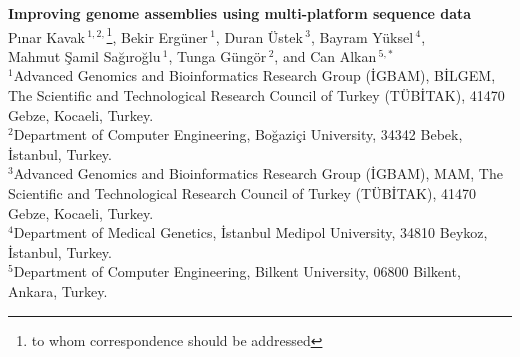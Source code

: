 \documentclass[12pt]{article}
\begin{document}
 \renewcommand{\thefootnote}{\fnsymbol{footnote}} 

\begin{center}
  {\bf Improving genome assemblies using multi-platform sequence data}\\

  P\i nar Kavak\,$^{1,2,}$\footnote{to whom correspondence should be addressed},  Bekir Erg\"{u}ner\,$^{1}$,  Duran \"{U}stek\,$^{3}$,  Bayram Y\"{u}ksel\,$^{4}$, \\
  Mahmut \c{S}amil Sa\u{g}\i ro\u{g}lu\,$^1$, 
  Tunga G\"{u}ng\"{o}r\,$^{2}$, and 
  Can Alkan\,$^{5,*}$ \\ 

  {\scriptsize
  $^{1}$Advanced Genomics and Bioinformatics Research Group (\.{I}GBAM), B\.{I}LGEM, The Scientific and Technological Research Council of Turkey (T\"{U}B\.{I}TAK), 41470 Gebze, Kocaeli, Turkey.\\
  $^{2}$Department of Computer Engineering, Bo\u{g}azi\c{c}i University, 34342 Bebek, \.{I}stanbul, Turkey.\\
  $^{3}$Advanced Genomics and Bioinformatics Research Group (\.{I}GBAM), MAM, The Scientific and Technological Research Council of Turkey (T\"{U}B\.{I}TAK), 41470 Gebze, Kocaeli, Turkey.\\
  $^{4}$Department of Medical Genetics, \.{I}stanbul Medipol University, 34810 Beykoz, \.{I}stanbul, Turkey.\\
  $^{5}$Department of Computer Engineering, Bilkent University, 06800 Bilkent, Ankara, Turkey.
  }
\end{center}

\begin{abstract}
\textit{De novo} assembly problem with the short reads of next generation sequencing technologies still waits for innovative approaches. There exist assembly programs with different capabilities depending on the sequencing technology. Some of them are hybrid assemblers that use more than one input type. Improving the resulting assembly is another specialty. We propose a new method to improve the assembly when there is more than one input type obtained from different sequencing technologies: Illumina, 454 and Ion-Torrent. We also compare the results with the existing hybrid assemblers Celera and Masurca.

\end{abstract}

\onehalfspacing
\end{document}
